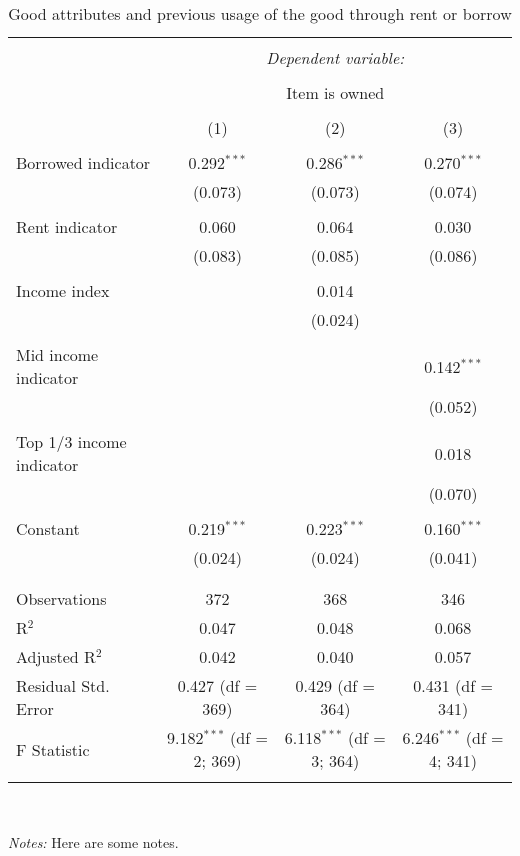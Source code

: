 
\begin{table}[!htbp] \centering 
  \caption{Good attributes and previous usage of the good through rent or borrow} 
  \label{tab:rents_borrows} 
\begin{tabular}{@{\extracolsep{5pt}}lccc} 
\\[-1.8ex]\hline 
\hline \\[-1.8ex] 
 & \multicolumn{3}{c}{\textit{Dependent variable:}} \\ 
\cline{2-4} 
\\[-1.8ex] & \multicolumn{3}{c}{Item is owned} \\ 
\\[-1.8ex] & (1) & (2) & (3)\\ 
\hline \\[-1.8ex] 
 Borrowed indicator & 0.292$^{***}$ & 0.286$^{***}$ & 0.270$^{***}$ \\ 
  & (0.073) & (0.073) & (0.074) \\ 
  & & & \\ 
 Rent indicator & 0.060 & 0.064 & 0.030 \\ 
  & (0.083) & (0.085) & (0.086) \\ 
  & & & \\ 
 Income index &  & 0.014 &  \\ 
  &  & (0.024) &  \\ 
  & & & \\ 
 Mid income indicator &  &  & 0.142$^{***}$ \\ 
  &  &  & (0.052) \\ 
  & & & \\ 
 Top 1/3 income indicator &  &  & 0.018 \\ 
  &  &  & (0.070) \\ 
  & & & \\ 
 Constant & 0.219$^{***}$ & 0.223$^{***}$ & 0.160$^{***}$ \\ 
  & (0.024) & (0.024) & (0.041) \\ 
  & & & \\ 
\hline \\[-1.8ex] 
Observations & 372 & 368 & 346 \\ 
R$^{2}$ & 0.047 & 0.048 & 0.068 \\ 
Adjusted R$^{2}$ & 0.042 & 0.040 & 0.057 \\ 
Residual Std. Error & 0.427 (df = 369) & 0.429 (df = 364) & 0.431 (df = 341) \\ 
F Statistic & 9.182$^{***}$ (df = 2; 369) & 6.118$^{***}$ (df = 3; 364) & 6.246$^{***}$ (df = 4; 341) \\ 
\hline 
\hline \\[-1.8ex] 
\end{tabular}
\\
{\footnotesize
\begin{minipage}{0.90 \linewidth}
\emph{Notes:} Here are some notes.
\end{minipage}
}
\end{table}
